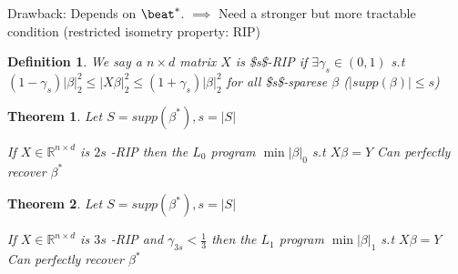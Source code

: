 \documentclass[11pt]{article}
\newtheorem{theorem}{Theorem}
\newtheorem{definition}{Definition}
\begin{document}
Drawback: Depends on \(\beat^*\).
\(\implies\) Need a stronger but more tractable condition (restricted isometry property: RIP)

\begin{definition}
We say a \(n \times d\) matrix \(X\) is \$s\$-RIP if \(\exists \gamma_s \in (0, 1)\) s.t
\((1 - \gamma_s) |\beta|_2^2 \le |X\beta|_2^2 \le (1+\gamma_s)|\beta|_2^2\) for all \$s\$-sparese \(\beta\) (\(|supp(\beta)| \le s\)) 
\label{orgspecialblock3}

\end{definition}

\begin{theorem}
Let \(S = supp(\beta^*), s = |S|\)

If \(X \in \mathbb{R}^{n \times d}\) is \(2s\) -RIP then the \(L_0\) program \(\min |\beta|_0\) s.t \(X\beta = Y\) Can perfectly recover \(\beta^*\)
\label{orgspecialblock4}

\end{theorem}

\begin{theorem}
Let \(S = supp(\beta^*), s = |S|\)

If \(X \in \mathbb{R}^{n \times d}\) is \(3s\) -RIP and \(\gamma_{3s} < \frac13\) then the \(L_1\) program \(\min |\beta|_1\) s.t \(X\beta = Y\) Can perfectly recover \(\beta^*\)
\label{orgspecialblock5}

\end{theorem}
\end{document}
